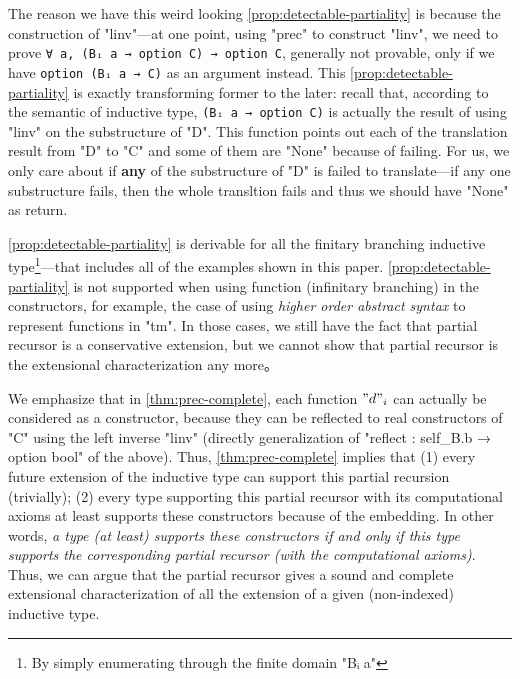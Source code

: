 The reason we have this weird looking \ref{prop:detectable-partiality} is because the construction of "linv"---at one point, using "prec" to construct "linv", we need to prove \texttt{∀ a, (Bᵢ a → option C) → option C}, generally not provable, only if we have \texttt{option (Bᵢ a → C)} as an argument instead. This \ref{prop:detectable-partiality} is exactly transforming former to the later: recall that, according to the semantic of inductive type, \texttt{(Bᵢ a → option C)} is actually the result of using "linv" on the substructure of "D". This function points out each of the translation result from "D" to "C" and some of them are "None" because of failing. For us, we only care about if \textbf{any} of the substructure of "D" is failed to translate---if any one substructure fails, then the whole transltion fails and thus we should have "None" as return. 

\ref{prop:detectable-partiality} is derivable for all the finitary branching inductive type\footnote{By simply enumerating through the finite domain "Bᵢ a"}---that includes all of the examples shown in this paper. \ref{prop:detectable-partiality} is not supported when using function (infinitary branching) in the constructors, for example, the case of using \textit{higher order abstract syntax} to represent functions in "tm". In those cases, we still have the fact that partial recursor is a conservative extension, but we cannot show that partial recursor is the extensional characterization any more。


We emphasize that in \cref{thm:prec-complete}, each function $"d"_i$ can
actually be considered as a constructor, because they can be reflected
to real constructors of "C" using the left inverse "linv" (directly generalization of "reflect : self_B.b → option bool" of the above). Thus, \cref{thm:prec-complete}
implies that (1) every future extension of the inductive type can
support this partial recursion (trivially); (2) every type supporting
this partial recursor with its computational axioms at least supports
these constructors because of the embedding. In other words, \textit{a
type (at least) supports these constructors if and only if this type
supports the corresponding partial recursor (with the computational
axioms)}.  Thus, we can argue that the partial recursor gives a sound and
complete extensional characterization of all the extension of a given (non-indexed)
inductive type.

